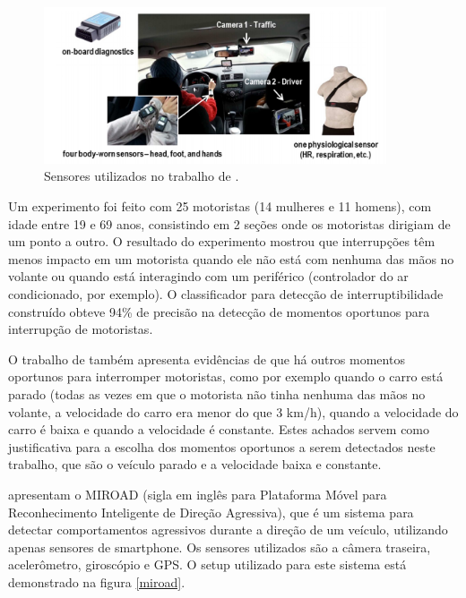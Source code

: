 \begin{figure}[h]
\centering
\includegraphics[width=0.9\textwidth]{images/kim-sensors.png}
\caption{Sensores utilizados no trabalho de .}
\label{kim-sensors}
\end{figure}

Um experimento foi feito com 25 motoristas (14 mulheres e 11 homens), com idade entre 19 e 69 anos, consistindo em 2 seções
onde os motoristas dirigiam de um ponto a outro. O resultado do experimento mostrou que interrupções têm menos impacto em um motorista
quando ele não está com nenhuma das mãos no volante ou quando está interagindo com um periférico (controlador do ar condicionado, por exemplo).
O classificador para detecção de interruptibilidade construído obteve 94\% de precisão na detecção de momentos
oportunos para interrupção de motoristas.

O trabalho de  também apresenta evidências de que há outros momentos oportunos para interromper motoristas, como
por exemplo quando o carro está parado (todas as vezes em que o motorista não tinha nenhuma das mãos no volante, a velocidade do carro era menor
do que 3 km/h), quando a velocidade do carro é baixa e quando a velocidade é constante. Estes achados servem como justificativa para a
escolha dos momentos oportunos a serem detectados neste trabalho, que são o veículo parado e a velocidade baixa e constante.


 apresentam o MIROAD (sigla em inglês para Plataforma Móvel para Reconhecimento
Inteligente de Direção Agressiva), que é um sistema para detectar comportamentos agressivos durante a direção de um veículo, utilizando
apenas sensores de smartphone. Os sensores utilizados são a câmera traseira, acelerômetro, giroscópio e GPS. O setup utilizado para este
sistema está demonstrado na figura \ref{miroad}.

